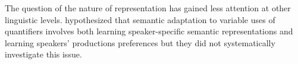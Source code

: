 



The question of the nature of representation has gained less attention at other linguistic levels. \cite{Yildirim2016}
hypothesized that semantic adaptation to variable uses of quantifiers  involves both learning speaker-specific semantic representations
and learning speakers' productions preferences but they did not systematically investigate this issue. 










